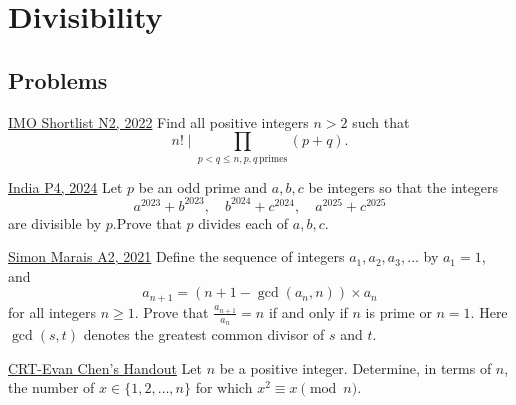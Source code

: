 \section{Divisibility}
\subsection{Problems}
\begin{problem}{1}{\href{https://artofproblemsolving.com/community/q2h3107356p34893836}{IMO Shortlist N2, 2022}}
	Find all positive integers $n>2$ such that
$$ n! \mid \prod_{ p<q\le n, p,q \, \text{primes}} (p+q).$$
\end{problem}

\begin{problem}{2}{\href{https://artofproblemsolving.com/community/c6h3239264p34615369}{India P4, 2024}}
	Let $p$ be an odd prime and $a,b,c$ be integers so that the integers$$a^{2023}+b^{2023},\quad b^{2024}+c^{2024},\quad a^{2025}+c^{2025}$$are divisible by $p$.Prove that $p$ divides each of $a,b,c$.
\end{problem}

\begin{problem}{3}{\href{https://artofproblemsolving.com/community/c7h2709003p34748857}{Simon Marais A2, 2021}}
	Define the sequence of integers $a_1, a_2, a_3, \ldots$ by $a_1 = 1$, and
\[ a_{n+1} = \left(n+1-\gcd(a_n,n) \right) \times a_n \]for all integers $n \ge 1$. Prove that $\frac{a_{n+1}}{a_n}=n$ if and only if $n$ is prime or $n=1$. Here $\gcd(s,t)$ denotes the greatest common divisor of $s$ and $t$.
\end{problem}

\begin{problem}{4}{\href{https://web.evanchen.cc/handouts/CRT/CRT.pdf}{CRT-Evan Chen's Handout}}
	Let $n$ be a positive integer. Determine, in terms of $n$, the number of $x\in\{1,2, \ldots, n\}$ for which $x^2\equiv x\pmod{n}$.
\end{problem}

\newpage
